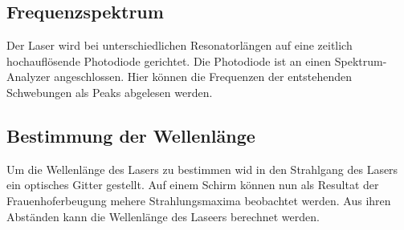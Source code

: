 \subsection{Frequenzspektrum}
\label{sec:Frequenzspektrum}
Der Laser wird bei unterschiedlichen Resonatorlängen auf eine zeitlich hochauflösende Photodiode gerichtet.
Die Photodiode ist an einen Spektrum-Analyzer angeschlossen. Hier können die Frequenzen der entstehenden 
Schwebungen als Peaks abgelesen werden.

\subsection{Bestimmung der Wellenlänge}
\label{sec:wellenlaenge}
Um die Wellenlänge des Lasers zu bestimmen wid in den Strahlgang des Lasers ein optisches Gitter gestellt.
Auf einem Schirm können nun als Resultat der Frauenhoferbeugung mehere Strahlungsmaxima beobachtet werden.
Aus ihren Abständen kann die Wellenlänge des Laseers berechnet werden.